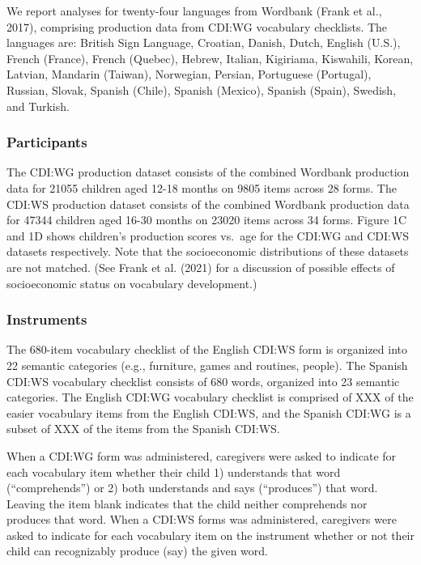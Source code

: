 \documentclass[10pt, letterpaper]{article}
\begin{document}
We report analyses for twenty-four languages from Wordbank (Frank et
al., 2017), comprising production data from CDI:WG vocabulary
checklists. The languages are: British Sign Language, Croatian, Danish,
Dutch, English (U.S.), French (France), French (Quebec), Hebrew,
Italian, Kigiriama, Kiswahili, Korean, Latvian, Mandarin (Taiwan),
Norwegian, Persian, Portuguese (Portugal), Russian, Slovak, Spanish
(Chile), Spanish (Mexico), Spanish (Spain), Swedish, and Turkish.

\hypertarget{participants}{%
\subsubsection{Participants}\label{participants}}

The CDI:WG production dataset consists of the combined Wordbank
production data for 21055 children aged 12-18 months on 9805 items
across 28 forms. The CDI:WS production dataset consists of the combined
Wordbank production data for 47344 children aged 16-30 months on 23020
items across 34 forms. Figure 1C and 1D shows children's production
scores vs.~age for the CDI:WG and CDI:WS datasets respectively. Note
that the socioeconomic distributions of these datasets are not matched.
(See Frank et al. (2021) for a discussion of possible effects of
socioeconomic status on vocabulary development.)

\hypertarget{instruments}{%
\subsubsection{Instruments}\label{instruments}}

The 680-item vocabulary checklist of the English CDI:WS form is
organized into 22 semantic categories (e.g., furniture, games and
routines, people). The Spanish CDI:WS vocabulary checklist consists of
680 words, organized into 23 semantic categories. The English CDI:WG
vocabulary checklist is comprised of XXX of the easier vocabulary items
from the English CDI:WS, and the Spanish CDI:WG is a subset of XXX of
the items from the Spanish CDI:WS.

When a CDI:WG form was administered, caregivers were asked to indicate
for each vocabulary item whether their child 1) understands that word
(``comprehends'') or 2) both understands and says (``produces'') that
word. Leaving the item blank indicates that the child neither
comprehends nor produces that word. When a CDI:WS forms was
administered, caregivers were asked to indicate for each vocabulary item
on the instrument whether or not their child can recognizably produce
(say) the given word.
\end{document}
